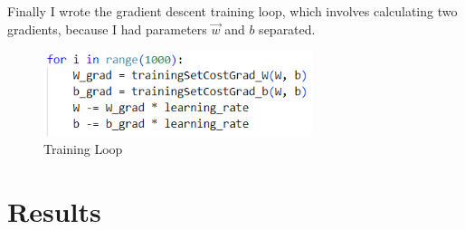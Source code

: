 \documentclass{article}
\begin{document}
            Finally I wrote the gradient descent training loop, which involves calculating two gradients, because I had parameters $\vec{w}$ and $b$ separated.
            \begin{figure}[H]
                \centering
                \includegraphics[width=0.7\textwidth]{training-loop.png}
                \caption{Training Loop}
                \label{fig:training-loop}
            \end{figure}

    \section*{Results}
\end{document}
